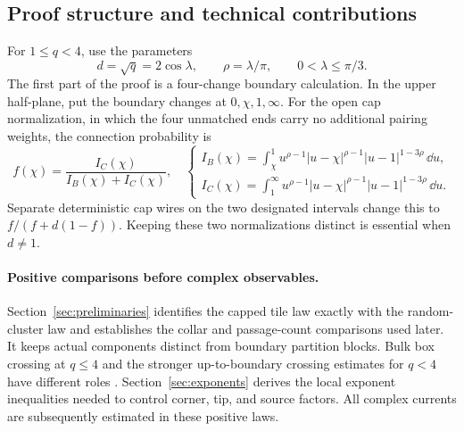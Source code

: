 \subsection{Proof structure and technical contributions}

For $1\le q<4$, use the parameters
\begin{equation}\label{intro:lambda-rho}
 d=\sqrt q=2\cos\lambda,\qquad
 \rho=\lambda/\pi,\qquad 0<\lambda\le\pi/3.
\end{equation}
The first part of the proof is a four-change boundary calculation.  In
the upper half-plane, put the boundary changes at $0,\chi,1,\infty$.
For the open cap normalization, in which the four unmatched ends carry
no additional pairing weights, the connection probability is
\begin{equation}\label{intro:fourchange-formula}
 f(\chi)=\frac{I_C(\chi)}{I_B(\chi)+I_C(\chi)},
 \quad
 \begin{cases}
 I_B(\chi)=\displaystyle\int_\chi^1
 u^{\rho-1}|u-\chi|^{\rho-1}|u-1|^{1-3\rho}\,\dd u,\\[3pt]
 I_C(\chi)=\displaystyle\int_1^\infty
 u^{\rho-1}|u-\chi|^{\rho-1}|u-1|^{1-3\rho}\,\dd u.
 \end{cases}
\end{equation}
Separate deterministic cap wires on the two designated intervals change
this to $f/(f+d(1-f))$.  Keeping these two normalizations distinct is
essential when $d\ne1$.

\paragraph{Positive comparisons before complex observables.}
Section~\ref{sec:preliminaries} identifies the capped tile law exactly
with the random-cluster law and establishes the collar and passage-count
comparisons used later.  It keeps actual components distinct from
boundary partition blocks.  Bulk box crossing at $q\le4$ and the stronger
up-to-boundary crossing estimates for $q<4$ have different roles
\citep{DCLM2019Isoradial,DMT2021Fractal}.  Section~\ref{sec:exponents}
derives the local exponent inequalities needed to control corner, tip,
and source factors.  All complex currents are subsequently estimated in
these positive laws.

